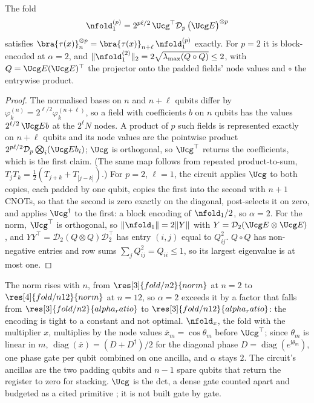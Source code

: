 \begin{proposition}
\label{prop:fold-optimal}
The fold
\begin{equation}
    \nfold_1^{(p)}=2^{p\ell/2}\,\Ucg^{\top}\mathcal{D}_p\,\bigl(\Ucg E\bigr)^{\otimes p}
    \label{eq:nodal-fold}
\end{equation}
satisfies $\bra{\tau(x)}_n^{\otimes p}=\bra{\tau(x)}_{n+\ell}\,\nfold_1^{(p)}$ exactly. For $p=2$ it is block-encoded at $\alpha=2$, and $\|\nfold_1^{(2)}\|_2=2\sqrt{\lambda_{\max}(Q\circ Q)}\le2$, with $Q=\Ucg E(\Ucg E)^\top$ the projector onto the padded fields' node values and $\circ$ the entrywise product.
\end{proposition}
\begin{proof}
The normalised bases on $n$ and $n+\ell$ qubits differ by $\varphi_k^{(n)}=2^{\ell/2}\varphi_k^{(n+\ell)}$, so a field with coefficients $b$ on $n$ qubits has the values $2^{\ell/2}\,\Ucg Eb$ at the $2^\ell N$ nodes. A product of $p$ such fields is represented exactly on $n+\ell$ qubits and its node values are the pointwise product $2^{p\ell/2}\mathcal{D}_p\bigotimes_i(\Ucg Eb_i)$; $\Ucg$ is orthogonal, so $\Ucg^\top$ returns the coefficients, which is the first claim. (The same map follows from repeated product-to-sum, $T_jT_k=\tfrac12(T_{j+k}+T_{|j-k|})$.) For $p=2$, $\ell=1$, the circuit applies $\Ucg$ to both copies, each padded by one qubit, copies the first into the second with $n+1$ CNOTs, so that the second is zero exactly on the diagonal, post-selects it on zero, and applies $\Ucg^\dagger$ to the first: a block encoding of $\nfold_1/2$, so $\alpha=2$. For the norm, $\Ucg^\top$ is orthogonal, so $\|\nfold_1\|=2\|Y\|$ with $Y=\mathcal{D}_2(\Ucg E\otimes\Ucg E)$, and $YY^\top=\mathcal{D}_2(Q\otimes Q)\mathcal{D}_2^\top$ has entry $(i,j)$ equal to $Q_{ij}^2$. $Q\circ Q$ has non-negative entries and row sums $\sum_jQ_{ij}^2=Q_{ii}\le1$, so its largest eigenvalue is at most one.
\end{proof}
The norm rises with $n$, from $\res[3]{fold/n2}{norm}$ at $n=2$ to $\res[4]{fold/n12}{norm}$ at $n=12$, so $\alpha=2$ exceeds it by a factor that falls from $\res[3]{fold/n2}{alpha_ratio}$ to $\res[3]{fold/n12}{alpha_ratio}$: the encoding is tight to a constant and not optimal. $\nfold_x$, the fold with the multiplier $x$, multiplies by the node values $\bar x_m=\cos\theta_m$ before $\Ucg^\top$; since $\theta_m$ is linear in $m$, $\operatorname{diag}(\bar x)=(D+D^\dagger)/2$ for the diagonal phase $D=\operatorname{diag}(e^{\mathrm{i}\theta_m})$, one phase gate per qubit combined on one ancilla, and $\alpha$ stays $2$. The circuit's ancillas are the two padding qubits and $n-1$ spare qubits that return the register to zero for stacking. $\Ucg$ is the \gls{dct}, a dense gate counted apart and budgeted as a cited primitive \cite{klappenecker2001dct}; it is not built gate by gate.

